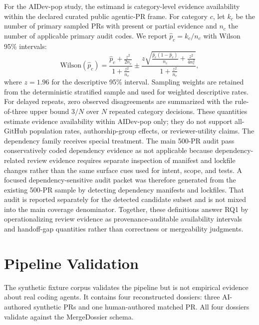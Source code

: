 \documentclass[10pt,conference]{IEEEtran}
\begin{document}
For the AIDev-pop study, the estimand is category-level evidence availability within the declared curated public agentic-PR frame.
For category $c$, let $k_c$ be the number of primary sampled PRs with present or partial evidence and $n_c$ the number of applicable primary audit codes.
We report $\hat{p}_c=k_c/n_c$ with Wilson 95\% intervals:
\begin{equation}
\mathrm{Wilson}(\hat{p}_c)=
\frac{\hat{p}_c+\frac{z^2}{2n_c}}{1+\frac{z^2}{n_c}}
\pm
\frac{z\sqrt{\frac{\hat{p}_c(1-\hat{p}_c)}{n_c}+\frac{z^2}{4n_c^2}}}
{1+\frac{z^2}{n_c}},
\end{equation}
where $z=1.96$ for the descriptive 95\% interval.
Sampling weights are retained from the deterministic stratified sample and used for weighted descriptive rates.
For delayed repeats, zero observed disagreements are summarized with the rule-of-three upper bound $3/N$ over $N$ repeated category decisions.
These quantities estimate evidence availability within AIDev-pop only; they do not support all-GitHub population rates, authorship-group effects, or reviewer-utility claims.
The dependency family receives special treatment.
The main 500-PR audit pass conservatively coded dependency evidence as not applicable because dependency-related review evidence requires separate inspection of manifest and lockfile changes rather than the same surface cues used for intent, scope, and tests.
A focused dependency-sensitive audit packet was therefore generated from the existing 500-PR sample by detecting dependency manifests and lockfiles.
That audit is reported separately for the detected candidate subset and is not mixed into the main coverage denominator.
Together, these definitions answer RQ1 by operationalizing review evidence as provenance-auditable availability intervals and handoff-gap quantities rather than correctness or mergeability judgments.

\section{Pipeline Validation}

The synthetic fixture corpus validates the pipeline but is not empirical evidence about real coding agents.
It contains four reconstructed dossiers: three AI-authored synthetic PRs and one human-authored matched PR.
All four dossiers validate against the MergeDossier schema.
\end{document}
